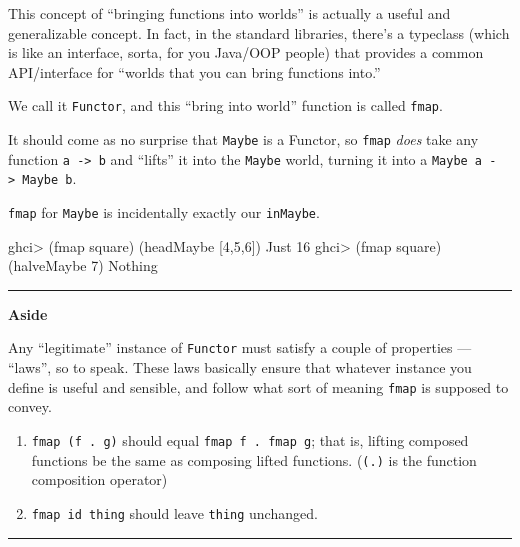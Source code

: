\documentclass[]{article}
\newenvironment{Shaded}{}{}
\newcommand{\DataTypeTok}[1]{\textcolor[rgb]{0.56,0.13,0.00}{{#1}}}
\newcommand{\DecValTok}[1]{\textcolor[rgb]{0.25,0.63,0.44}{{#1}}}
\newcommand{\FunctionTok}[1]{\textcolor[rgb]{0.02,0.16,0.49}{{#1}}}
\newcommand{\NormalTok}[1]{{#1}}
\begin{document}
This concept of ``bringing functions into worlds'' is actually a useful
and generalizable concept. In fact, in the standard libraries, there's a
typeclass (which is like an interface, sorta, for you Java/OOP people)
that provides a common API/interface for ``worlds that you can bring
functions into.''

We call it \texttt{Functor}, and this ``bring into world'' function is
called \texttt{fmap}.

It should come as no surprise that \texttt{Maybe} is a Functor, so
\texttt{fmap} \emph{does} take any function
\texttt{a\ -\textgreater{}\ b} and ``lifts'' it into the \texttt{Maybe}
world, turning it into a \texttt{Maybe\ a\ -\textgreater{}\ Maybe\ b}.

\texttt{fmap} for \texttt{Maybe} is incidentally exactly our
\texttt{inMaybe}.

\begin{Shaded}
\begin{Highlighting}[]
\NormalTok{ghci}\FunctionTok{>} \NormalTok{(fmap square) (headMaybe [}\DecValTok{4}\NormalTok{,}\DecValTok{5}\NormalTok{,}\DecValTok{6}\NormalTok{])}
\DataTypeTok{Just} \DecValTok{16}
\NormalTok{ghci}\FunctionTok{>} \NormalTok{(fmap square) (halveMaybe }\DecValTok{7}\NormalTok{)}
\DataTypeTok{Nothing}
\end{Highlighting}
\end{Shaded}

\begin{center}\rule{0.5\linewidth}{\linethickness}\end{center}

\textbf{Aside}

Any ``legitimate'' instance of \texttt{Functor} must satisfy a couple of
properties --- ``laws'', so to speak. These laws basically ensure that
whatever instance you define is useful and sensible, and follow what
sort of meaning \texttt{fmap} is supposed to convey.

\begin{enumerate}
\def\labelenumi{\arabic{enumi}.}
\tightlist
\item
  \texttt{fmap\ (f\ .\ g)} should equal \texttt{fmap\ f\ .\ fmap\ g};
  that is, lifting composed functions be the same as composing lifted
  functions. (\texttt{(.)} is the function composition operator)
\item
  \texttt{fmap\ id\ thing} should leave \texttt{thing} unchanged.
\end{enumerate}

\begin{center}\rule{0.5\linewidth}{\linethickness}\end{center}
\end{document}
